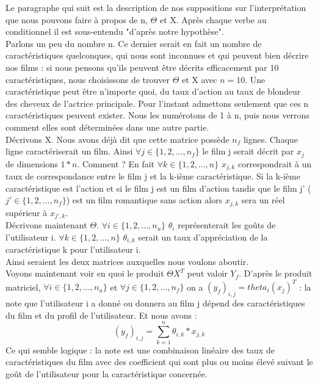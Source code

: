 \documentclass[a4paper,10pt]{article}
\begin{document}
Le paragraphe qui suit est la description de nos suppositions sur l'interprétation que nous pouvons faire à propos de n, $\Theta$ et X. Après chaque verbe au conditionnel il est sous-entendu "d'après notre hypothèse".\\
Parlons un peu du nombre n. Ce dernier serait en fait un nombre de caractéristiques quelconques, qui nous sont inconnues et qui peuvent bien décrire nos films : si nous pensons qu'ils peuvent être décrits efficacement par 10 caractéristiques, nous choisissons de trouver $\Theta$ et X avec $n = 10$. 
Une caractéristique peut être n'importe quoi, du taux d'action au taux de blondeur des cheveux de l'actrice principale. Pour l'instant admettons seulement que ces n caractéristiques peuvent exister. Nous les numérotons de 1 à n, puis nous verrons comment elles sont déterminées dans une autre partie.\\
Décrivons X. Nous avons déjà dit que cette matrice possède $n_f$ lignes. Chaque ligne caractériserait un film. Ainsi $\forall j \in \{1, 2, ..., n_f\}$ le film j serait décrit par $x_j$ de dimensions $1 * n$. Comment ? En fait $\forall k \in \{1, 2, ..., n\}$ $x_{j,k}$ correspondrait à un taux de correspondance entre le film j et la k-ième caractéristique. Si la k-ième caractéristique est l'action et si le film j est un film d'action tandis que le film j' ($j' \in \{1, 2, ..., n_f\}$) est un film romantique sans action alors $x_{j,k}$ sera un réel supérieur à $x_{j',k}$.\\
Décrivons maintenant $\Theta$. $\forall i \in \{1, 2, ..., n_u\}$ $\theta_{i}$ représenterait les goûts de l'utilisateur i. $\forall k \in \{1, 2, ..., n\}$ $\theta_{i,k}$ serait un taux d'appréciation de la caractéristique k pour l'utilisateur i.\\
Ainsi seraient les deux matrices auxquelles nous voulons aboutir.\\

Voyons maintenant voir en quoi le produit $\Theta X^T$ peut valoir $Y_f$. D'après le produit matriciel, $\forall i \in \{1, 2, ..., n_u\}$ et $\forall j \in \{1, 2, ..., n_f\}$ on a $(y_{f})_{i,j} = theta_{i}(x_{j})^{T}$ : la note que l'utilisateur i a donné ou donnera au film j dépend des caractéristiques du film et du profil de l'utilisateur. Et nous avons :
\[(y_{f})_{i,j} = \sum_{k = 1}^{n} \theta_{i,k} * x_{j,k}\]
Ce qui semble logique : la note est une combinaison linéaire des taux de caractéristiques du film avec des coefficient qui sont plus ou moins élevé suivant le goût de l'utilisateur pour la caractéristique concernée.
\end{document}
